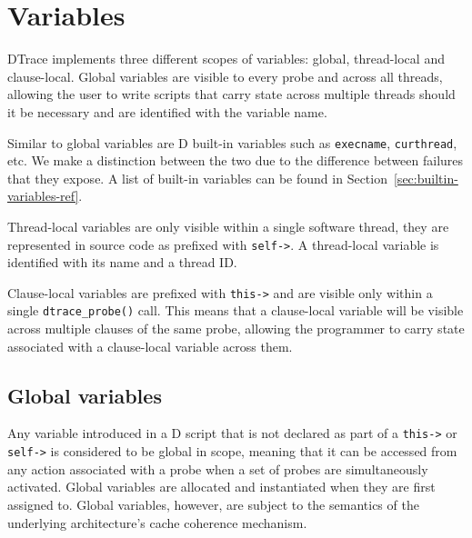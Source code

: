 

\section{Variables}
\label{sec:d-variables}
DTrace implements three different scopes of variables: global, thread-local and
clause-local. Global variables are visible to every probe and across all
threads, allowing the user to write scripts that carry state across multiple
threads should it be necessary and are identified with the variable name. 

Similar to global variables are D built-in variables such as \verb|execname|,
\verb|curthread|, etc. We make a distinction between the two due to the
difference between failures that they expose. A list of built-in variables can
be found in Section~\ref{sec:builtin-variables-ref}.

Thread-local variables are only visible within a single software thread, they
are represented in source code as prefixed with \texttt{self->}.  A thread-local
variable is identified with its name and a thread ID.

Clause-local variables are prefixed with \texttt{this->} and are visible only
within a single \texttt{dtrace\_probe()} call. This means that a clause-local
variable will be visible across multiple clauses of the same probe, allowing the
programmer to carry state associated with a clause-local variable across them.

\subsection{Global variables}
\label{subsec:global-variables}

Any variable introduced in a D script that is not declared as part of a
\verb|this->| or \verb|self->| is considered to be global in scope, meaning that
it can be accessed from any action associated with a probe when a set of probes
are simultaneously activated.  Global variables are allocated and instantiated
when they are first assigned to.  Global variables, however, are subject to the
semantics of the underlying architecture's cache coherence mechanism.

